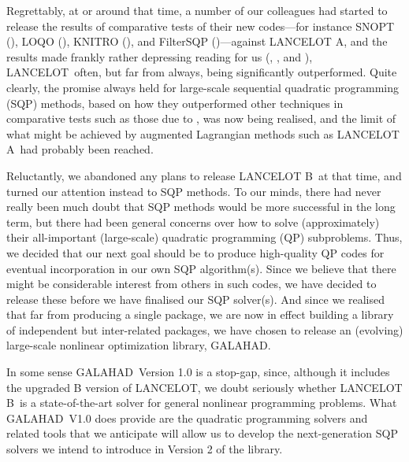\documentclass[twoside]{article}
\newcommand{\gal}{{\sf GALAHAD}}
\newcommand{\lan}{{\sf LANCELOT}}
\newcommand{\lana}{{\sf LANCELOT A}}
\newcommand{\lanb}{{\sf LANCELOT B}}
\begin{document}
Regrettably, at or around that time, a number of our colleagues
had started to release the results of comparative tests of their
new codes---for instance SNOPT (),
LOQO (),
KNITRO (), and
FilterSQP ()---against \lana,
and the results made frankly rather depressing reading for us
(, , and ), \lan\
often, but far from always, being significantly outperformed.
Quite clearly, the promise always held for large-scale
sequential quadratic programming (SQP) methods,
based on how they outperformed other techniques in comparative tests
such as those due to \cite{HockSchi81}, was now being realised, and the
limit of what might be achieved by augmented Lagrangian methods
such as \lana\ had probably been reached.

Reluctantly, we abandoned any plans to release \lanb\ at that time, and turned
our attention instead to SQP methods. To our minds, there had never
really been much doubt that SQP methods would be more successful in the
long term, but there had been  general concerns over
how to solve (approximately) their all-important (large-scale) quadratic
programming (QP) subproblems. Thus, we decided that our next goal
should be to produce high-quality QP codes for eventual incorporation
in our own SQP algorithm(s). Since we believe that there might
be considerable interest from others in such codes, we have decided to release
these before we have finalised our SQP solver(s). And since we realised that
far from producing a single package, we are now in effect building a
library of independent but inter-related packages, we have chosen to
release an (evolving) large-scale nonlinear optimization library, \gal.

In some sense \gal\ Version 1.0 is a stop-gap, since, although
it includes the upgraded B version of \lan, we doubt seriously whether
\lanb\ is a state-of-the-art solver for general nonlinear programming
problems. What \gal\ V1.0 does provide are the quadratic programming solvers
and related tools that we anticipate will allow us to develop the
next-generation SQP solvers
we intend to introduce in Version 2 of the library.


\end{document}
